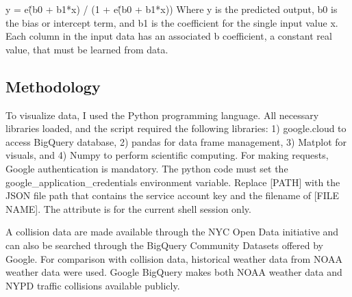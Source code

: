 \documentclass[conference]{IEEEtran}
\begin{document}
y = e\^ (b0 + b1*x) / (1 + e\^(b0 + b1*x))
\newline 
\newline
Where y is the predicted output, b0 is the bias or intercept term, and b1 is the coefficient for the single input value x. Each column in the input data has an associated b coefficient, a constant real value, that must be learned from data.
%
%
%
\subsection{Methodology}
To visualize data, I used the Python programming language.  All necessary libraries loaded, and the script required the following libraries: 1) google.cloud to access BigQuery database, 2) pandas for data frame management, 3) Matplot for visuals, and 4) Numpy to perform scientific computing.  For making requests, Google authentication is mandatory. The python code must set the google\_application\_credentials environment variable. Replace [PATH] with the JSON file path that contains the service account key and the filename of [FILE NAME]. The attribute is for the current shell session only.

A collision data are made available through the NYC Open Data initiative and can also be searched through the BigQuery Community Datasets offered by Google. For comparison with collision data, historical weather data from NOAA weather data were used.  Google BigQuery makes both NOAA weather data and NYPD traffic collisions available publicly. 
\end{document}
